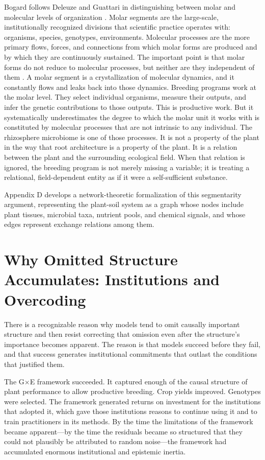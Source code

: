 \documentclass[11pt, a4paper]{article}
\begin{document}
Bogard follows Deleuze and Guattari in distinguishing between molar and molecular levels of organization \citep{bogard1998}. Molar segments are the large-scale, institutionally recognized divisions that scientific practice operates with: organisms, species, genotypes, environments. Molecular processes are the more primary flows, forces, and connections from which molar forms are produced and by which they are continuously sustained. The important point is that molar forms do not reduce to molecular processes, but neither are they independent of them \citep{anderson1972}. A molar segment is a crystallization of molecular dynamics, and it constantly flows and leaks back into those dynamics. Breeding programs work at the molar level. They select individual organisms, measure their outputs, and infer the genetic contributions to those outputs. This is productive work. But it systematically underestimates the degree to which the molar unit it works with is constituted by molecular processes that are not intrinsic to any individual. The rhizosphere microbiome is one of those processes. It is not a property of the plant in the way that root architecture is a property of the plant. It is a relation between the plant and the surrounding ecological field. When that relation is ignored, the breeding program is not merely missing a variable; it is treating a relational, field-dependent entity as if it were a self-sufficient substance.

Appendix D develops a network-theoretic formalization of this segmentarity argument, representing the plant-soil system as a graph whose nodes include plant tissues, microbial taxa, nutrient pools, and chemical signals, and whose edges represent exchange relations among them.

\section{Why Omitted Structure Accumulates: Institutions and Overcoding}

There is a recognizable reason why models tend to omit causally important structure and then resist correcting that omission even after the structure's importance becomes apparent. The reason is that models succeed before they fail, and that success generates institutional commitments that outlast the conditions that justified them.

The G$\times$E framework succeeded. It captured enough of the causal structure of plant performance to allow productive breeding. Crop yields improved. Genotypes were selected. The framework generated returns on investment for the institutions that adopted it, which gave those institutions reasons to continue using it and to train practitioners in its methods. By the time the limitations of the framework became apparent---by the time the residuals became so structured that they could not plausibly be attributed to random noise---the framework had accumulated enormous institutional and epistemic inertia.
\end{document}
